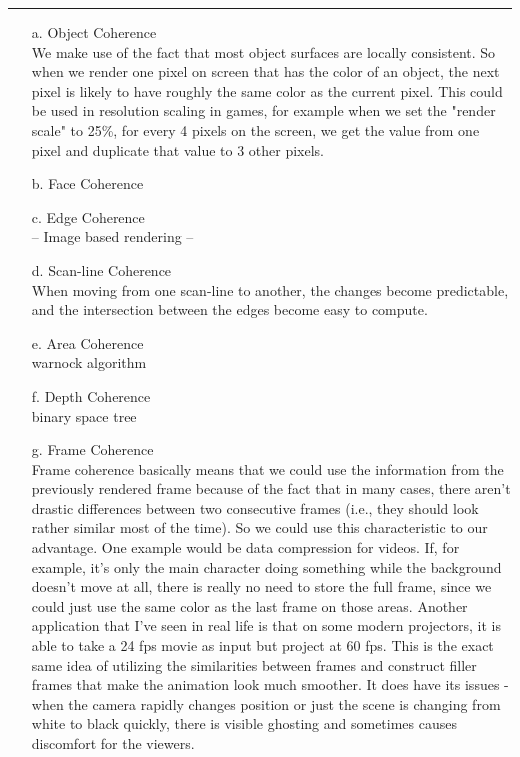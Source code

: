 \documentclass[12pt]{article}
\begin{document}
\bigskip
\hrule
\bigskip
\begin{enumerate}
	\item[a.]{Object Coherence}\\
		We make use of the fact that most object surfaces are locally consistent. So when we render one
		pixel on screen that has the color of an object, the next pixel is likely to have roughly
		the same color as the current pixel. This could be used in resolution scaling in games,
		for example when we set the "render scale" to 25\%, for every 4 pixels on the screen, we 
		get the value from one pixel and duplicate that value to 3 other pixels.
	\item[b.]{Face Coherence}\\

	\item[c.]{Edge Coherence}\\
	--
	Image based rendering
	--
	\item[d.]{Scan-line Coherence}\\
		When moving from one scan-line to another, the changes become predictable, and the intersection
		between the edges become easy to compute.
	\item[e.]{Area Coherence}\\
	warnock algorithm
	\item[f.]{Depth Coherence}\\
	binary space tree
	\item[g.]{Frame Coherence}\\
		Frame coherence basically means that we could use the information from the previously rendered
		frame because of the fact that in many cases, there aren't drastic differences between two 
		consecutive frames (i.e., they should look rather similar most of the time). So we could use
		this characteristic to our advantage. One example would be data compression for videos. If, for
		example, it's only the main character doing something while the background doesn't move at all,
		there is really no need to store the full frame, since we could just use the same color as the 
		last frame on those areas. Another application that I've seen in real life is that on some 
		modern projectors, it is able to take a 24 fps movie as input but project at 60 fps. This is 
		the exact same idea of utilizing the similarities between frames and construct filler frames 
		that make the animation look much smoother. It does have its issues -  when the camera rapidly
		changes position or just the scene is changing from white to black quickly, there is visible 
		ghosting and sometimes causes discomfort for the viewers.
\end{enumerate}
\end{document}
